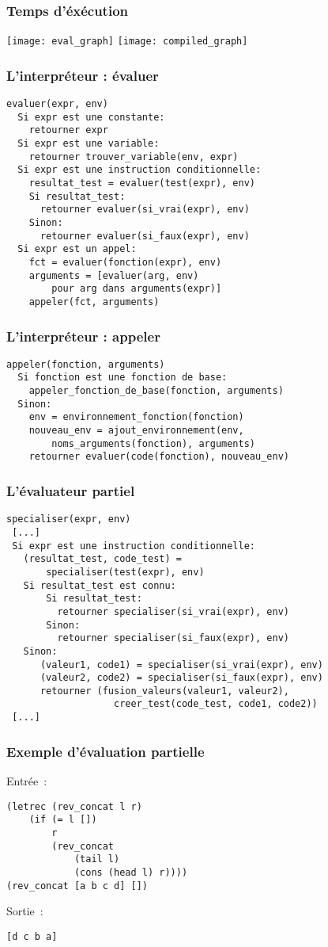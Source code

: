 \documentclass[mathserif]{beamer}
\begin{document}
\begin{frame}
\frametitle{Temps d'éxécution}
\texttt{[image: eval\_graph]}
\texttt{[image: compiled\_graph]}
\end{frame}


\begin{frame}[fragile]
\frametitle{L'interpréteur : évaluer}
\begin{lstlisting}
evaluer(expr, env)
  Si expr est une constante:
    retourner expr
  Si expr est une variable:
    retourner trouver_variable(env, expr)
  Si expr est une instruction conditionnelle:
    resultat_test = evaluer(test(expr), env)
    Si resultat_test:
      retourner evaluer(si_vrai(expr), env)
    Sinon:
      retourner evaluer(si_faux(expr), env)
  Si expr est un appel:
    fct = evaluer(fonction(expr), env)
    arguments = [evaluer(arg, env)
        pour arg dans arguments(expr)]
    appeler(fct, arguments)
\end{lstlisting}
\end{frame}
\begin{frame}[fragile]
\frametitle{L'interpréteur : appeler}
\begin{lstlisting}
appeler(fonction, arguments)
  Si fonction est une fonction de base:
    appeler_fonction_de_base(fonction, arguments)
  Sinon:
    env = environnement_fonction(fonction)
    nouveau_env = ajout_environnement(env,
        noms_arguments(fonction), arguments)
    retourner evaluer(code(fonction), nouveau_env)
\end{lstlisting}
\end{frame}

\begin{frame}[fragile]
\frametitle{L'évaluateur partiel}
{\small
\begin{lstlisting}
specialiser(expr, env)
 [...]
 Si expr est une instruction conditionnelle:
   (resultat_test, code_test) =
       specialiser(test(expr), env)
   Si resultat_test est connu:
       Si resultat_test:
         retourner specialiser(si_vrai(expr), env)
       Sinon:
         retourner specialiser(si_faux(expr), env)
   Sinon:
      (valeur1, code1) = specialiser(si_vrai(expr), env)
      (valeur2, code2) = specialiser(si_faux(expr), env)
      retourner (fusion_valeurs(valeur1, valeur2),
                   creer_test(code_test, code1, code2))
 [...]
\end{lstlisting}
}
\end{frame}

\begin{frame}[fragile]
\frametitle{Exemple d'évaluation partielle}
Entrée~:
\begin{lstlisting}[language=L]
(letrec (rev_concat l r)
    (if (= l [])
        r
        (rev_concat
            (tail l)
            (cons (head l) r))))
(rev_concat [a b c d] [])
\end{lstlisting}
Sortie~:
\begin{lstlisting}
[d c b a]
\end{lstlisting}
\end{frame}
\end{document}
